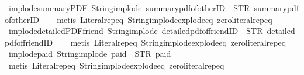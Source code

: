 \begin{isabellebody}
\isamarkupfalse%
\ implode{\isacharunderscore}summaryPDF{\isacharcolon}\ {\isachardoublequoteopen}String{\isachardot}implode\ {\isacharprime}{\isacharprime}summary{\isacharunderscore}pdf{\isacharunderscore}of{\isacharunderscore}otherID{\isacharprime}{\isacharprime}\ {\isacharequal}\ STR\ {\isacharprime}{\isacharprime}summary{\isacharunderscore}pdf{\isacharunderscore}of{\isacharunderscore}otherID{\isacharprime}{\isacharprime}{\isachardoublequoteclose}\isanewline
%
\isadelimproof
\ \ %
\endisadelimproof
%
\isatagproof
{}\isamarkupfalse%
\ {\isacharparenleft}metis\ Literal{\isachardot}rep{\isacharunderscore}eq\ String{\isachardot}implode{\isacharunderscore}explode{\isacharunderscore}eq\ zero{\isacharunderscore}literal{\isachardot}rep{\isacharunderscore}eq{\isacharparenright}%
\endisatagproof
{\isafoldproof}%
%
\isadelimproof
\isanewline
%
\endisadelimproof
\isanewline
{}\isamarkupfalse%
\ implode{\isacharunderscore}detailedPDF{\isacharunderscore}friend{\isacharcolon}\ {\isachardoublequoteopen}String{\isachardot}implode\ {\isacharprime}{\isacharprime}detailed{\isacharunderscore}pdf{\isacharunderscore}of{\isacharunderscore}friendID{\isacharprime}{\isacharprime}\ {\isacharequal}\ STR\ {\isacharprime}{\isacharprime}detailed{\isacharunderscore}pdf{\isacharunderscore}of{\isacharunderscore}friendID{\isacharprime}{\isacharprime}{\isachardoublequoteclose}\isanewline
%
\isadelimproof
\ \ %
\endisadelimproof
%
\isatagproof
{}\isamarkupfalse%
\ {\isacharparenleft}metis\ Literal{\isachardot}rep{\isacharunderscore}eq\ String{\isachardot}implode{\isacharunderscore}explode{\isacharunderscore}eq\ zero{\isacharunderscore}literal{\isachardot}rep{\isacharunderscore}eq{\isacharparenright}%
\endisatagproof
{\isafoldproof}%
%
\isadelimproof
\isanewline
%
\endisadelimproof
\isanewline
{}\isamarkupfalse%
\ implode{\isacharunderscore}paid{\isacharcolon}\ {\isachardoublequoteopen}String{\isachardot}implode\ {\isacharprime}{\isacharprime}paid{\isacharprime}{\isacharprime}\ {\isacharequal}\ STR\ {\isacharprime}{\isacharprime}paid{\isacharprime}{\isacharprime}{\isachardoublequoteclose}\isanewline
%
\isadelimproof
\ \ %
\endisadelimproof
%
\isatagproof
{}\isamarkupfalse%
\ {\isacharparenleft}metis\ Literal{\isachardot}rep{\isacharunderscore}eq\ String{\isachardot}implode{\isacharunderscore}explode{\isacharunderscore}eq\ zero{\isacharunderscore}literal{\isachardot}rep{\isacharunderscore}eq{\isacharparenright}%
\endisatagproof
{\isafoldproof}%
%
\isadelimproof
\isanewline
%
\endisadelimproof
\isanewline

\end{isabellebody}
